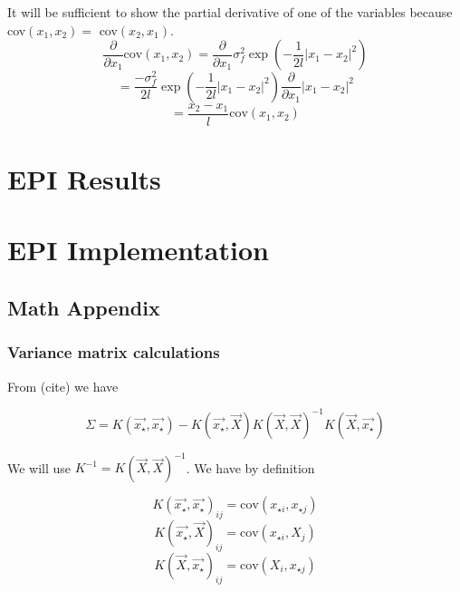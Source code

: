 \documentclass[phd,tocprelim]{cornell}
\begin{document}
It will be sufficient to show the partial derivative of one of the variables because cov$(x_{1}, x_{2}) = $ cov$(x_{2}, x_{1})$.
\begin{equation}
  \frac{\partial}{\partial x_{1}} \mbox{cov}(x_{1}, x_{2}) = \frac{\partial}{\partial x_{1}} \sigma_{f}^{2} \exp\left( - \frac{1}{2l} |x_{1} - x_{2}|^{2}\right)
\end{equation}
\begin{equation}
  =  \frac{-\sigma_{f}^{2}}{2l} \exp\left( - \frac{1}{2l} |x_{1} - x_{2}|^{2}\right) \frac{\partial}{\partial x_{1}} |x_{1} - x_{2}|^{2}
\end{equation}
\begin{equation}
  =  \frac{x_{2} - x_{1}}{l} \mbox{cov}(x_{1}, x_{2})
\end{equation}


\chapter{EPI Results} %
\label{cha:EPI Results}


\chapter{EPI Implementation} %
\label{cha:EPI Implementation}

\section{Math Appendix}

\subsection{Variance matrix calculations}

From (cite) we have

\begin{equation}
 \Sigma = K(\vec{x_{\star}}, \vec{x_{\star}}) - K(\vec{x_{\star}}, \vec{X}) K(\vec{X}, \vec{X})^{-1} K(\vec{X}, \vec{x_{\star}})
\end{equation}

We will use $K^{-1} = K(\vec{X}, \vec{X})^{-1}$. We have by definition

\begin{equation}
 K(\vec{x_{\star}}, \vec{x_{\star}})_{ij} = \mbox{cov}(x_{\star i}, x_{\star j})
\end{equation}
\begin{equation}
 K(\vec{x_{\star}}, \vec{X})_{ij} = \mbox{cov}(x_{\star i}, X_{j})
\end{equation}
\begin{equation}
 K(\vec{X}, \vec{x_{\star}})_{ij} = \mbox{cov}(X_{i}, x_{\star j})
\end{equation}
\end{document}
